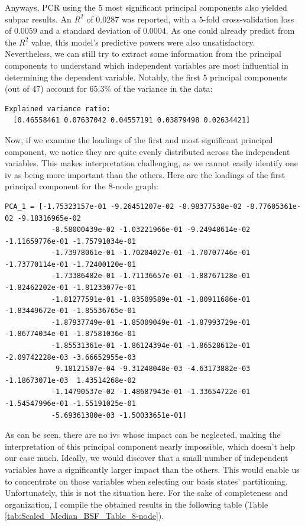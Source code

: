 Anyways, PCR using the $5$ most significant principal components also yielded subpar results. An $R^2$ of $0.0287$ was reported, with a $5$-fold cross-validation loss of $0.0059$ and a standard deviation of $0.0004$. As one could already predict from the $R^2$ value, this model's predictive powers were also unsatisfactory. Nevertheless, we can still try to extract some information from the principal components to understand which independent variables are most influential in determining the dependent variable. Notably, the first $5$ principal components (out of $47$) account for $65.3\%$ of the variance in the data:
\begin{lstlisting}[caption={Explained variance ratio for the first $5$ \acrshort{pc}\textcolor{gray}{s} ($8$-node graph).}, captionpos=b, style=DOS]
  Explained variance ratio:
  [0.46558461 0.07637042 0.04557191 0.03879498 0.02634421]
\end{lstlisting}
Now, if we examine the loadings of the first and most significant principal component, we notice they are quite evenly distributed across the independent variables. This makes interpretation challenging, as we cannot easily identify one \acrshort{iv} as being more important than the others. Here are the loadings of the first principal component for the $8$-node graph:
\begin{lstlisting}[caption={Loadings of the first \acrshort{pc}, for the $8$-node graph.}, captionpos=b, style=DOS]
  PCA_1 = [-1.75323157e-01 -9.26451207e-02 -8.98377538e-02 -8.77605361e-02 -9.18316965e-02
           -8.58000439e-02 -1.03221966e-01 -9.24948614e-02 -1.11659776e-01 -1.75791034e-01
           -1.73978061e-01 -1.70204027e-01 -1.70707746e-01 -1.73770114e-01 -1.72400120e-01
           -1.73386482e-01 -1.71136657e-01 -1.88767128e-01 -1.82462202e-01 -1.81233077e-01
           -1.81277591e-01 -1.83509589e-01 -1.80911686e-01 -1.83449672e-01 -1.85536765e-01
           -1.87937749e-01 -1.85009049e-01 -1.87993729e-01 -1.86774034e-01 -1.87581036e-01
           -1.85531361e-01 -1.86124394e-01 -1.86528612e-01 -2.09742228e-03 -3.66652955e-03
            9.18121507e-04 -9.31248048e-03 -4.63173882e-03 -1.18673071e-03  1.43514268e-02
           -1.14790537e-02 -1.48687943e-01 -1.33654722e-01 -1.54547996e-01 -1.55191025e-01
           -5.69361380e-03 -1.50033651e-01]
  \end{lstlisting}
As can be seen, there are no \acrshort{iv}\textcolor{gray}{s} whose impact can be neglected, making the interpretation of this principal component nearly impossible, which doesn't help our case much. Ideally, we would discover that a small number of independent variables have a significantly larger impact than the others. This would enable us to concentrate on those variables when selecting our basis states' partitioning. Unfortunately, this is not the situation here. For the sake of completeness and organization, I compile the obtained results in the following table (Table \ref{tab:Scaled_Median_BSF_Table_8-node}).
